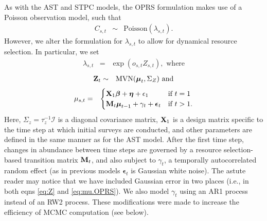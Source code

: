 \documentclass[12pt,fleqn]{article}
\begin{document}
\begin{flushleft}
As with the AST and STPC models, the OPRS formulation makes use of a Poisson observation model, such that
\begin{eqnarray*}
  C_{s,t} & \sim & \textrm{Poisson}(\lambda_{s,t}).
\end{eqnarray*}
However, we alter the formulation for $\lambda_{s,t}$ to allow for dynamical resource selection.  In
particular, we set
\begin{eqnarray*}
  \lambda_{s,t} & = & \exp(o_{s,t} Z_{s,t}), \textrm{ where}
\end{eqnarray*}
\begin{eqnarray}
  {\bf Z}_t & \sim & \textrm{MVN}(\boldsymbol{\mu}_t,\Sigma_Z) \textrm{ and}
  \label{eq:Z}
\end{eqnarray}
\begin{eqnarray}
  \mu_{s,t} & = &  \begin{cases}
                    {\bf X}_1 \boldsymbol{\beta} + \boldsymbol{\eta} + \epsilon_1 & \text{if }t=1 \\
                     {\bf M}_t \boldsymbol{\mu}_{t-1} + \gamma_t + \boldsymbol{\epsilon}_t & \text{if }t>1.
                  \end{cases}
  \label{eq:mu.OPRS}
\end{eqnarray}
Here, $\Sigma_z = \tau_z^{-1} \mathcal{I}$ is a diagonal covariance matrix, ${\bf X}_{1}$ is a design matrix specific to the time step at which initial surveys are conducted, and other parameters are defined in the same manner as for the AST model. After the first time step, changes in abundance between time steps are governed by a resource selection-based transition matrix ${\bf M}_t$, and also subject to $\gamma_t$, a temporally autocorrelated random effect (as in previous models $\boldsymbol{\epsilon}_t$ is Gaussian white noise).
The astute reader may notice that we have included Gaussian error in two places (i.e., in both eqns \ref{eq:Z} and \ref{eq:mu.OPRS}).  We also model $\gamma_t$ using an AR1 process instead of an RW2 process. These modifications were made to increase the efficiency of MCMC computation (see below).


\end{flushleft}
\end{document}
